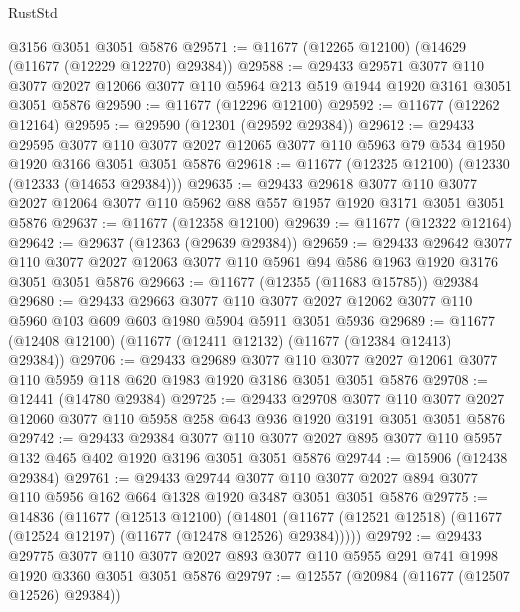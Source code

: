 \begin{lexlean}{RustStd}
\begin{coremodule}
    @3156
    @3051
    @3051
    @5876
@29571 := @11677 (@12265 @12100) (@14629 (@11677 (@12229 @12270) @29384))
@29588 := @29433
    @29571
    @3077
    @110
    @3077
    @2027
    @12066
    @3077
    @110
    @5964
    @213
    @519
    @1944
    @1920
    @3161
    @3051
    @3051
    @5876
@29590 := @11677 (@12296 @12100)
@29592 := @11677 (@12262 @12164)
@29595 := @29590 (@12301 (@29592 @29384))
@29612 := @29433
    @29595
    @3077
    @110
    @3077
    @2027
    @12065
    @3077
    @110
    @5963
    @79
    @534
    @1950
    @1920
    @3166
    @3051
    @3051
    @5876
@29618 := @11677 (@12325 @12100) (@12330 (@12333 (@14653 @29384)))
@29635 := @29433
    @29618
    @3077
    @110
    @3077
    @2027
    @12064
    @3077
    @110
    @5962
    @88
    @557
    @1957
    @1920
    @3171
    @3051
    @3051
    @5876
@29637 := @11677 (@12358 @12100)
@29639 := @11677 (@12322 @12164)
@29642 := @29637 (@12363 (@29639 @29384))
@29659 := @29433
    @29642
    @3077
    @110
    @3077
    @2027
    @12063
    @3077
    @110
    @5961
    @94
    @586
    @1963
    @1920
    @3176
    @3051
    @3051
    @5876
@29663 := @11677 (@12355 (@11683 @15785)) @29384
@29680 := @29433
    @29663
    @3077
    @110
    @3077
    @2027
    @12062
    @3077
    @110
    @5960
    @103
    @609
    @603
    @1980
    @5904
    @5911
    @3051
    @5936
@29689 := @11677 (@12408 @12100) (@11677 (@12411 @12132) (@11677 (@12384 @12413) @29384))
@29706 := @29433
    @29689
    @3077
    @110
    @3077
    @2027
    @12061
    @3077
    @110
    @5959
    @118
    @620
    @1983
    @1920
    @3186
    @3051
    @3051
    @5876
@29708 := @12441 (@14780 @29384)
@29725 := @29433
    @29708
    @3077
    @110
    @3077
    @2027
    @12060
    @3077
    @110
    @5958
    @258
    @643
    @936
    @1920
    @3191
    @3051
    @3051
    @5876
@29742 := @29433
    @29384
    @3077
    @110
    @3077
    @2027
    @895
    @3077
    @110
    @5957
    @132
    @465
    @402
    @1920
    @3196
    @3051
    @3051
    @5876
@29744 := @15906 (@12438 @29384)
@29761 := @29433
    @29744
    @3077
    @110
    @3077
    @2027
    @894
    @3077
    @110
    @5956
    @162
    @664
    @1328
    @1920
    @3487
    @3051
    @3051
    @5876
@29775 := @14836
    (@11677
      (@12513 @12100)
      (@14801 (@11677 (@12521 @12518) (@11677 (@12524 @12197) (@11677 (@12478 @12526) @29384)))))
@29792 := @29433
    @29775
    @3077
    @110
    @3077
    @2027
    @893
    @3077
    @110
    @5955
    @291
    @741
    @1998
    @1920
    @3360
    @3051
    @3051
    @5876
@29797 := @12557 (@20984 (@11677 (@12507 @12526) @29384))

\end{coremodule}
\end{lexlean}

